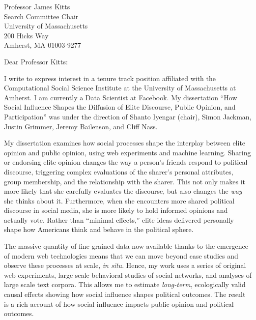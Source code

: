 \documentclass[fontsize=12pt, paper=a4]{scrlttr2}
\date{October 6, 2014}
\begin{document}
\enlargethispage{2\baselineskip}

\begin{letter}{Professor James Kitts\\
Search Committee Chair\\
University of Massachusetts\\
200 Hicks Way\\
Amherst, MA 01003-9277}

\opening{Dear Professor Kitts:}  %

I write to express interest in a tenure track position affiliated with the Computational Social Science Institute at the University of Massachusetts at Amherst.  I am currently a Data Scientist at Facebook.  %
My dissertation ``How Social Influence Shapes the Diffusion of Elite Discourse, Public Opinion, and Participation'' was under the direction of Shanto Iyengar (chair), Simon Jackman, Justin Grimmer, Jeremy Bailenson, and Cliff Nass.

My dissertation examines how social processes shape the interplay between elite opinion and public opinion, using web experiments and machine learning.  Sharing or endorsing elite opinion changes the way a person's friends respond to political discourse, triggering complex evaluations of the sharer's personal attributes, group membership, and the relationship with the sharer.  This not only makes it more likely that she carefully evaluates the discourse, but also changes the \emph{way} she thinks about it.  Furthermore, when she encounters more shared political discourse in social media, she is more likely to hold informed opinions and actually vote.  Rather than ``minimal effects,'' elite ideas delivered personally shape how Americans think and behave in the political sphere.

The massive quantity of fine-grained data now available thanks to the emergence of modern web technologies means that we can move beyond case studies and observe these processes at scale, \emph{in situ}.  Hence, my work uses a series of original web-experiments, large-scale behavioral studies of social networks, and analyses of large scale text corpora.  This allows me to estimate \emph{long-term}, ecologically valid causal effects showing how social influence shapes political outcomes.  The result is a rich account of how social influence impacts public opinion and political outcomes.  


\end{letter}
\end{document}
